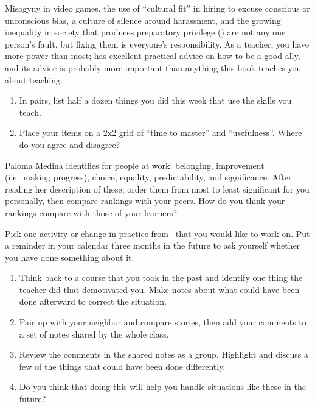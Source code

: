Misogyny in video games,
the use of ``cultural fit'' in hiring to excuse conscious or unconscious bias,
a culture of silence around harassment,
and the growing inequality in society that produces preparatory privilege ()
are not any one person's fault,
but fixing them is everyone's responsibility.
As a teacher,
you have more power than most;
has excellent practical advice on how to be a good ally,
and its advice is probably more important than anything this book teaches you about teaching.



\begin{enumerate}

\item
  In pairs,
  list half a dozen things you did this week that use the skills you teach.

\item
  Place your items on a 2x2 grid of ``time to master'' and ``usefulness''.
  Where do you agree and disagree?

\end{enumerate}


Paloma Medina identifies  for people at work:
belonging,
improvement (i.e.\ making progress),
choice,
equality,
predictability,
and significance.
After reading her description of these,
order them from most to least significant for you personally,
then compare rankings with your peers.
How do you think your rankings compare with those of your learners?


Pick one activity or change in practice from~\cite{Lee2017} that you would like to work on.
Put a reminder in your calendar three months in the future
to ask yourself whether you have done something about it.


\begin{enumerate}
\item
  Think back to a course that you took in the past
  and identify one thing the teacher did that demotivated you.
  Make notes about what could have been done afterward to correct the situation.
\item
  Pair up with your neighbor and compare stories,
  then add your comments to a set of notes shared by the whole class.
\item
  Review the comments in the shared notes as a group.
  Highlight and discuss a few of the things that could have been done differently.
\item
  Do you think that doing this will help you handle situations like these in the future?
\end{enumerate}

